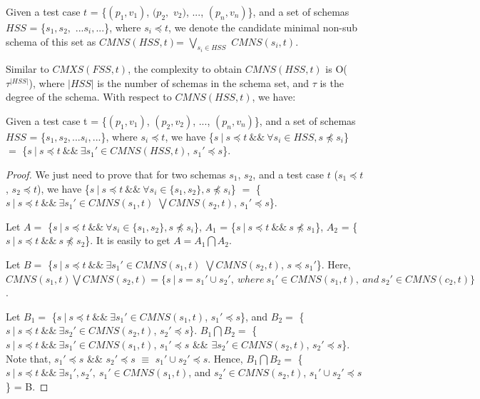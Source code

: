 {\begin{definition}
Given a test case $t$ = \{$(p_{1}, v_{1})$, $(p_{2}, $ $v_{2})$, ..., $(p_{n}, v_{n})$\}, and a set of schemas $HSS$ = \{$s_{1} , s_{2},$ $  ...s_{i}, ...$\}, where $ s_{i} \preceq t$, we denote the candidate minimal non-sub schema of this set as $CMNS(HSS,t)$=  $\bigvee_{s_{i}\in HSS}$ $ CMNS(s_{i}, t)$.
\end{definition}

Similar to $CMXS(FSS,t)$, the complexity to obtain $CMNS(HSS,t)$ is O($\tau^{|HSS|}$), where $|HSS|$ is the number of schemas in the schema set, and $\tau$ is the degree of the schema. With respect to $CMNS(HSS,t)$, we have:

\begin{proposition}\label{pro:superofCMNS2}
Given a test case t = \{$(p_{1}, v_{1})$, $(p_{2}, v_{2})$, ..., $(p_{n}, v_{n})$\}, and a set of schemas $HSS$ = \{$s_{1} , s_{2}, ... s_{i}, ...$\}, where $s_{i} \preceq t$,  we have \{$s\ |\ s \preceq t\ \&\&\ \forall s_{i} \in HSS, s \npreceq s_{i} $\} $=$  \{$ s\ |\ s \preceq t \ \&\& \ \exists s_{1}' \in CMNS(HSS, t)$, $s_{1}' \preceq s$\}.
\end{proposition}

\begin{proof}
We just need to prove that for two schemas $s_{1}$, $s_{2}$, and a test case $t$ ($s_{1} \preceq t$, $s_{2} \preceq t$), we have \{$s\ |\ s \preceq t\ \&\&\ \forall s_{i} \in \{s_{1}, s_{2}\}, s \npreceq s_{i} $\} $=$  \{$ s\ |\ s \preceq t \ \&\&\  \exists s_{1}' \in CMNS(s_{1}, t)$ $ \bigvee CMNS(s_{2}, t)$, $s_{1}' \preceq s$\}.

Let $A = $ \{$s\ |\ s \preceq t\ \&\&\ \forall s_{i} \in \{s_{1}, s_{2}\}, s \npreceq s_{i} $\}, $A_{1}$ = \{$s\ |\ s \preceq t\ \&\&\  s \npreceq s_{1} $\}, $A_{2}$ = \{$s\ |\ s \preceq t\ \&\&\  s \npreceq s_{2} $\}. It is easily to get $A = A_{1} \bigcap A_{2}$.

Let $B = $ \{$ s\ |\ s \preceq t \ \&\&\  \exists s_{1}' \in CMNS(s_{1}, t)$ $ \bigvee CMNS(s_{2}, t)$, $s \preceq s_{1}'$\}. Here,    $ CMNS(s_{1}, t) \bigvee CMNS(s_{2}, t) = \{ s\ |\ s = s_{1}' \cup s_{2}',\ where\ s_{1}' \in CMNS(s_{1}, t),\ and\ s_{2}' \in CMNS(c_{2}, t) \}$.

Let $B_{1} = $ \{$ s\ |\ s \preceq t \ \&\&\  \exists s_{1}' \in CMNS(s_{1}, t)$, $s_{1}' \preceq s$\}, and $B_{2} = $ \{$ s\ |\ s \preceq t \ \&\&\  \exists s_{2}' \in CMNS(s_{2}, t)$, $s_{2}' \preceq s$\}. $B_{1} \bigcap B_{2} = $ \{$ s\ |\ s \preceq t \ \&\&\  \exists s_{1}' \in CMNS(s_{1}, t)$, $s_{1}' \preceq s$ \&\& $\exists s_{2}' \in CMNS(s_{2}, t)$, $s_{2}' \preceq s$\}. Note that, $s_{1}' \preceq s $ \&\& $s_{2}' \preceq s$ $\equiv$ $s_{1}' \cup s_{2}' \preceq s$. Hence, $B_{1} \bigcap B_{2} = $ \{$ s\ |\ s \preceq t \ \&\&\  \exists s_{1}', s_{2}',\  s_{1}' \in CMNS(s_{1}, t)$, and $s_{2}' \in CMNS(s_{2}, t)$, $ s_{1}' \cup s_{2}' \preceq s$ \} = B.


\end{proof}}
